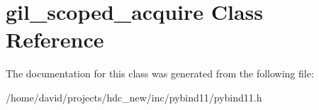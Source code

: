 \hypertarget{classgil__scoped__acquire}{}\section{gil\+\_\+scoped\+\_\+acquire Class Reference}
\label{classgil__scoped__acquire}


The documentation for this class was generated from the following file\+:\begin{DoxyCompactItemize}
\item 
/home/david/projects/hdc\+\_\+new/inc/pybind11/pybind11.\+h\end{DoxyCompactItemize}
